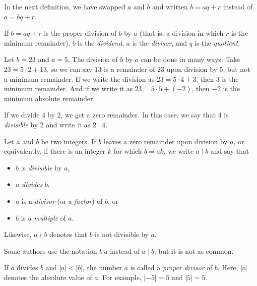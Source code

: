 \documentclass{subfile}
\begin{document}
In the next definition, we have swapped $a$ and $b$ and written $b=aq+r$ instead of $a=bq+r$.

	\begin{definition}
		If $b=aq+r$ is the proper division of $b$ by $a$ (that is, a division in which $r$ is the minimum remainder), $b$ is the \textit{dividend}, $a$ is the \textit{divisor}, and $q$ is the \textit{quotient}.
	\end{definition}

	\begin{example}
		Let $b=23$ and $a=5$. The division of $b$ by $a$ can be done in many ways. Take $23=5\cdot2+13$, so we can say $13$ is a remainder of $23$ upon division by $5$, but not a minimum remainder. If we write the division as $23=5\cdot4+3$, then $3$ is the minimum remainder. And if we write it as $23=5\cdot5+(-2)$, then $-2$ is the minimum absolute remainder.
	\end{example}

	If we divide $4$ by $2$, we get a zero remainder. In this case, we say that $4$ is \textit{divisible} by $2$ and write it as $2\mid 4$.

	\begin{definition}
		Let $a$ and $b$ be two integers. If $b$ leaves a zero remainder upon division by $a$, or equivalently, if there is an integer $k$ for which $b=ak$, we write $a \mid b$ and say that
		\begin{itemize}
			\item $b$ is \textit{divisible} by $a$,
			\item $a$ \textit{divides} $b$,
			\item $a$ is a \textit{divisor} (or a \textit{factor}) of $b$, or
			\item $b$ is a \textit{multiple} of $a$.
		\end{itemize}
		Likewise, $a\nmid b$ denotes that $b$ is not divisible by $a$.
	\end{definition}

	\begin{remark}
		Some authors use the notation $b\vdots a$ instead of $a\mid b$, but it is not as common.
	\end{remark}

	\begin{definition}
		If $a$ divides $b$ and $|a|<|b|$, the number $a$ is called a \textit{proper divisor} of $b$. Here, $|a|$ denotes the absolute value of $a$. For example, $|-5|=5$ and $|5|=5$.
	\end{definition}
\end{document}
